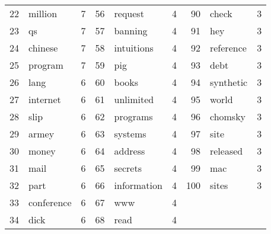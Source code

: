 \documentclass[10pt, a4paper]{article}
\begin{document}
\begin{table}[H]
\begin{tabular}{@{}rlrrlrrlr@{}}
22 & million & 7 & 56 & request & 4 & 90 & check & 3 \\
23 & qs & 7 & 57 & banning & 4 & 91 & hey & 3 \\
24 & chinese & 7 & 58 & intuitions & 4 & 92 & reference & 3 \\
25 & program & 7 & 59 & pig & 4 & 93 & debt & 3 \\
26 & lang & 6 & 60 & books & 4 & 94 & synthetic & 3 \\
27 & internet & 6 & 61 & unlimited & 4 & 95 & world & 3 \\
28 & slip & 6 & 62 & programs & 4 & 96 & chomsky & 3 \\
29 & armey & 6 & 63 & systems & 4 & 97 & site & 3 \\
30 & money & 6 & 64 & address & 4 & 98 & released & 3 \\
31 & mail & 6 & 65 & secrets & 4 & 99 & mac & 3 \\
32 & part & 6 & 66 & information & 4 & 100 & sites & 3 \\
33 & conference & 6 & 67 & www & 4 & & & \\
34 & dick & 6 & 68 & read & 4 & & & \\
\bottomrule
\end{tabular}
\label{table:subjcorpus}
\end{table}
\end{document}
